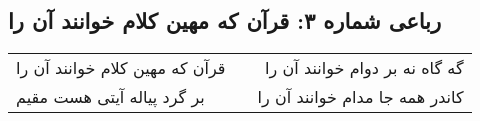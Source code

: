 \begin{center}
\section*{رباعی شماره ۳: قرآن که مهین کلام خوانند آن را}
\label{sec:sh003}
\begin{longtable}{l p{0.5cm} r}
قرآن که مهین کلام خوانند آن را
&&
گه گاه نه بر دوام خوانند آن را
\\
بر گرد پیاله آیتی هست مقیم
&&
کاندر همه جا مدام خوانند آن را
\\
\end{longtable}
\end{center}
